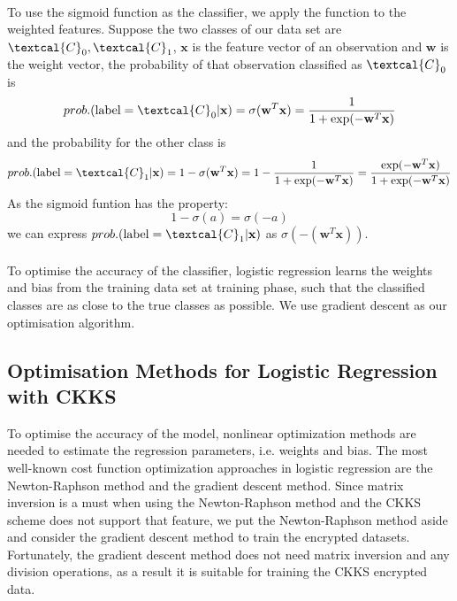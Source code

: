     \\
    To use the sigmoid function as the classifier, we apply the function to the weighted features. Suppose the two classes of our data set are $\textcal{C}_0, \textcal{C}_1$, $\mathbf{x}$ is the feature vector of an observation and $\mathbf{w}$ is the weight vector, the probability of that observation classified as  $\textcal{C}_0$ is
    \[
    prob.(\text{label} = \textcal{C}_0 | \mathbf{x}) = \sigma(\mathbf{w}^T\mathbf{x}) = \frac{1}{1 + \exp(-\mathbf{w}^T\mathbf{x})}
    \]
    and the probability for the other class is 
     \[
    prob.(\text{label} = \textcal{C}_1 | \mathbf{x}) = 1 - \sigma(\mathbf{w}^T\mathbf{x}) = 1 - \frac{1}{1 + \exp(-\mathbf{w}^T\mathbf{x})} = \frac{\exp(-\mathbf{w}^T\mathbf{x})}{1 + \exp(-\mathbf{w}^T\mathbf{x})}
    \]
    As the sigmoid funtion has the property:
    \[
    1 - \sigma(a) = \sigma(-a)
    \]
    we can express $prob.(\text{label} = \textcal{C}_1 | \mathbf{x})$ as $\sigma(-(\mathbf{w}^T\mathbf{x}))$.\\
    \\
    To optimise the accuracy of the classifier, logistic regression learns the weights and bias from the training data set at training phase, such that the classified classes are as close to the true classes as possible. We use gradient descent as our optimisation algorithm.
    \subsection{Optimisation Methods for Logistic Regression with CKKS} 
   To optimise the accuracy of the model, nonlinear optimization methods are needed to estimate the regression parameters, i.e. weights and bias. The most well-known cost function optimization approaches in logistic regression are the Newton-Raphson method and the gradient descent method. Since matrix inversion is a must when using the Newton-Raphson method and the CKKS scheme does not support that feature, we put the Newton-Raphson method aside and consider the gradient descent method to train the encrypted datasets. Fortunately, the gradient descent method does not need matrix inversion and any division operations, as a result it is suitable for training the CKKS encrypted data.\\
